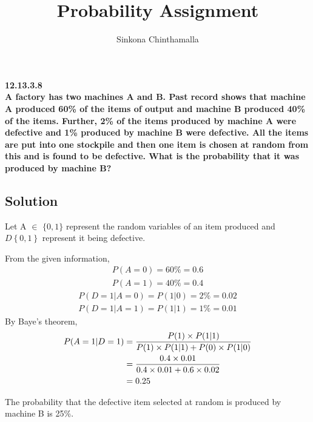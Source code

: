 \documentclass[10pt,column]{article}
\title{\textbf{Probability Assignment}}
\author{Sinkona Chinthamalla}
\providecommand{\cbrak}[1]{\ensuremath{\left\{#1\right\}}}
\begin{document}
\maketitle

\textbf{12.13.3.8 \\
A factory has two machines A and B. Past record shows that machine A produced 60\% of the items of output and machine B produced 40\% of the items. Further, 2\% of the items produced by machine A were defective and 1\% produced by machine B were defective. All the items are put into one stockpile and then one item is chosen at random from this and is found to be defective. What is the probability that it was produced by machine B?}

\subsection*{Solution}
Let A $\in$ $\{0,1\}$ represent the random variables of an item produced and $D \cbrak{0,1}$ represent it being defective.

From the given information,
\begin{align}
P(A=0) = 60 {\%} = 0.6\\
P(A=1) = 40 {\%} =0.4
\end{align}
\begin{align}
    P(D=1|A=0) = P(1|0) = 2 {\%} =0.02 \\
    P(D=1|A=1) = P(1|1) = 1 {\%} =0.01
\end{align}
By Baye's theorem, 
\begin{align}
P(A=1|D=1)
&= \frac{P(1)\times P(1|1)}{P(1)\times P(1|1) + P(0)\times P(1|0)} \vspace{0.1cm}\\
&= \frac{0.4\times 0.01}{0.4\times 0.01 + 0.6\times 0.02} \vspace{0.1cm}\\
&= 0.25
\end{align}

The probability that the defective item selected at random is produced by machine B is 25{\%}.
\end{document}

